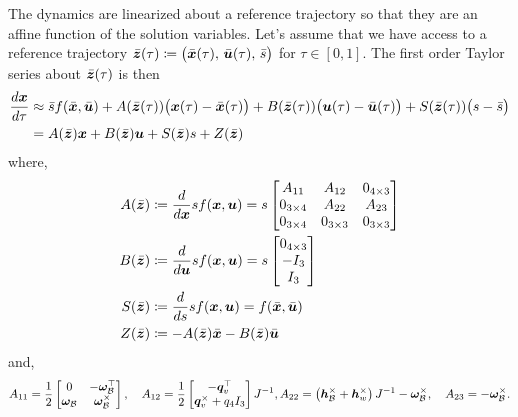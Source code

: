\documentclass[10pt]{article}
\begin{document}
The dynamics are linearized about a reference trajectory so that they are an affine function of the solution variables. Let's assume that we have access to a reference trajectory $\bar{\bm{z}}(\tau) \coloneqq \big(\bar{\bm{x}}(\tau),\,\bar{\bm{u}}(\tau),\,\bar{s}\big)$ for $\tau\in[0,1]$. The first order Taylor series about $\bar{\bm{z}}(\tau)$ is then
\begin{subequations}\label{eq:linearization}
\begin{align}
\frac{d \bm{x}}{d \tau} &\approx \bar{s} f(\bar{\bm{x}},\bar{\bm{u}}) + A(\bar{\bm{z}}(\tau)) \big(\bm{x}(\tau)-\bar{\bm{x}}(\tau) \big) + B(\bar{\bm{z}}(\tau)) \big( \bm{u}(\tau) - \bar{\bm{u}}(\tau) \big) + S(\bar{\bm{z}}(\tau)) \big( s - \bar{s} \big) \\
&= A(\bar{\bm{z}}) \bm{x} + B(\bar{\bm{z}}) \bm{u} + S(\bar{\bm{z}}) s + Z(\bar{\bm{z}})
\end{align}
\end{subequations}
where,
\begin{subequations}
\begin{align}
A(\bar{\bm{z}}) &\coloneqq \frac{d }{d \bm{x}} s f(\bm{x},\bm{u}) = s \begin{bmatrix}
A_{11} & A_{12} & 0_{4 \times 3} \\
0_{3 \times 4} & A_{22} & A_{23} \\
0_{3 \times 4} & 0_{3 \times 3} & 0_{3 \times 3}
\end{bmatrix} \\
B(\bar{\bm{z}}) &\coloneqq \frac{d }{d \bm{u}} s f(\bm{x},\bm{u}) = s \begin{bmatrix}
0_{4 \times 3} \\ -I_{3} \\ I_{3}
\end{bmatrix} \\
S(\bar{\bm{z}}) &\coloneqq \frac{d }{d s} s f(\bm{x},\bm{u}) = f(\bar{\bm{x}},\bar{\bm{u}}) \\
Z(\bar{\bm{z}}) &\coloneqq - A(\bar{\bm{z}}) \bar{\bm{x}} - B(\bar{\bm{z}}) \bar{\bm{u}} 
\end{align}
\end{subequations}
and,
\begin{equation*}
A_{11} = \frac{1}{2} \begin{bmatrix}
0  & -\bm{\omega}_{\mathcal{B}}^{\top}  \\ \bm{\omega}_{\mathcal{B}} & \bm{\omega}_{\mathcal{B}}^{\times}
\end{bmatrix}, \quad A_{12} = \frac{1}{2}\begin{bmatrix}
-\bm{q}_v^{\top} \\ \bm{q}_v^{\times} + q_4 I_{3}
\end{bmatrix} J^{-1}, A_{22} = \left(\bm{h}_{\mathcal{B}}^{\times}+\bm{h}_w^{\times}\right)J^{-1} - \bm{\omega}_{\mathcal{B}}^{\times}, \quad A_{23} = - \bm{\omega}_{\mathcal{B}}^{\times}.
\end{equation*}
\end{document}
